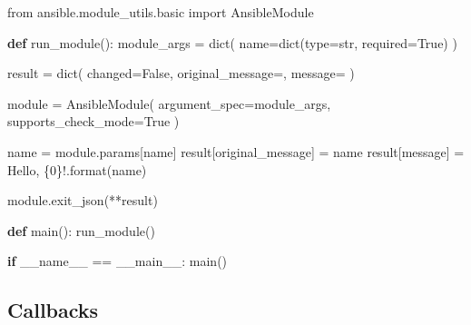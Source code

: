 \documentclass[
  letterpaper,
  DIV=11,
  numbers=noendperiod]{scrreprt}
\newenvironment{Shaded}{\begin{snugshade}}{\end{snugshade}}
\newcommand{\BuiltInTok}[1]{\textcolor[rgb]{0.00,0.23,0.31}{#1}}
\newcommand{\ControlFlowTok}[1]{\textcolor[rgb]{0.00,0.23,0.31}{\textbf{#1}}}
\newcommand{\ImportTok}[1]{\textcolor[rgb]{0.00,0.46,0.62}{#1}}
\newcommand{\KeywordTok}[1]{\textcolor[rgb]{0.00,0.23,0.31}{\textbf{#1}}}
\newcommand{\NormalTok}[1]{\textcolor[rgb]{0.00,0.23,0.31}{#1}}
\newcommand{\OperatorTok}[1]{\textcolor[rgb]{0.37,0.37,0.37}{#1}}
\newcommand{\SpecialCharTok}[1]{\textcolor[rgb]{0.37,0.37,0.37}{#1}}
\newcommand{\StringTok}[1]{\textcolor[rgb]{0.13,0.47,0.30}{#1}}
\newcommand{\VariableTok}[1]{\textcolor[rgb]{0.07,0.07,0.07}{#1}}
\begin{document}
\begin{Shaded}
\begin{Highlighting}[]
\ImportTok{from}\NormalTok{ ansible.module\_utils.basic }\ImportTok{import}\NormalTok{ AnsibleModule}

\KeywordTok{def}\NormalTok{ run\_module():}
\NormalTok{    module\_args }\OperatorTok{=} \BuiltInTok{dict}\NormalTok{(}
\NormalTok{        name}\OperatorTok{=}\BuiltInTok{dict}\NormalTok{(}\BuiltInTok{type}\OperatorTok{=}\StringTok{\textquotesingle{}str\textquotesingle{}}\NormalTok{, required}\OperatorTok{=}\VariableTok{True}\NormalTok{)}
\NormalTok{    )}

\NormalTok{    result }\OperatorTok{=} \BuiltInTok{dict}\NormalTok{(}
\NormalTok{        changed}\OperatorTok{=}\VariableTok{False}\NormalTok{,}
\NormalTok{        original\_message}\OperatorTok{=}\StringTok{\textquotesingle{}\textquotesingle{}}\NormalTok{,}
\NormalTok{        message}\OperatorTok{=}\StringTok{\textquotesingle{}\textquotesingle{}}
\NormalTok{    )}

\NormalTok{    module }\OperatorTok{=}\NormalTok{ AnsibleModule(}
\NormalTok{        argument\_spec}\OperatorTok{=}\NormalTok{module\_args,}
\NormalTok{        supports\_check\_mode}\OperatorTok{=}\VariableTok{True}
\NormalTok{    )}

\NormalTok{    name }\OperatorTok{=}\NormalTok{ module.params[}\StringTok{\textquotesingle{}name\textquotesingle{}}\NormalTok{]}
\NormalTok{    result[}\StringTok{\textquotesingle{}original\_message\textquotesingle{}}\NormalTok{] }\OperatorTok{=}\NormalTok{ name}
\NormalTok{    result[}\StringTok{\textquotesingle{}message\textquotesingle{}}\NormalTok{] }\OperatorTok{=} \StringTok{\textquotesingle{}Hello, }\SpecialCharTok{\{0\}}\StringTok{!\textquotesingle{}}\NormalTok{.}\BuiltInTok{format}\NormalTok{(name)}

\NormalTok{    module.exit\_json(}\OperatorTok{**}\NormalTok{result)}

\KeywordTok{def}\NormalTok{ main():}
\NormalTok{    run\_module()}

\ControlFlowTok{if} \VariableTok{\_\_name\_\_} \OperatorTok{==} \StringTok{\textquotesingle{}\_\_main\_\_\textquotesingle{}}\NormalTok{:}
\NormalTok{    main()}
\end{Highlighting}
\end{Shaded}

\subsection{Callbacks}\label{callbacks}
\end{document}
